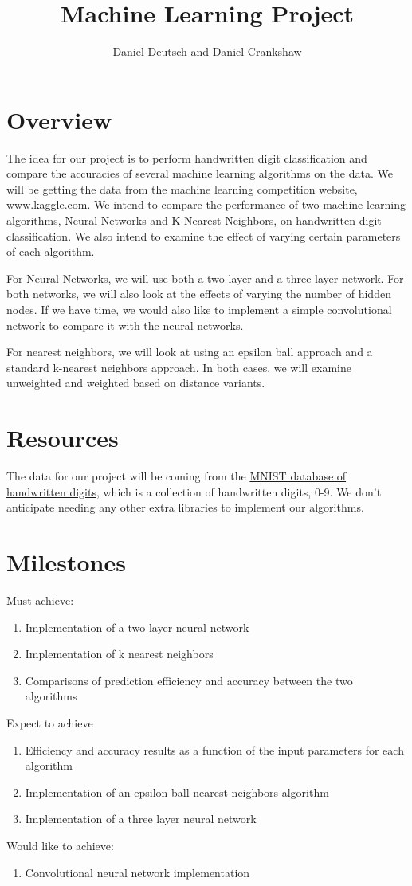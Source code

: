 \documentclass[11pt,a4paper]{article}
\author{Daniel Deutsch and Daniel Crankshaw}
\title{Machine Learning Project}
\date{}
\begin{document}
\maketitle
\section*{Overview}
The idea for our project is to perform handwritten digit classification and compare the accuracies of several machine learning algorithms on the data. We will be getting the data from the machine learning competition website, www.kaggle.com. We intend to compare the performance of two machine learning algorithms, Neural Networks and K-Nearest Neighbors, on handwritten digit classification. We also intend to examine the effect of varying certain parameters of each algorithm. 

For Neural Networks, we will use both a two layer and a three layer network. For both networks, we will also look at the effects of varying the number of hidden nodes. If we have time, we would also like to implement a simple convolutional network to compare it with the neural networks. 

For nearest neighbors, we will look at using an epsilon ball approach and a standard k-nearest neighbors approach. In both cases, we will examine unweighted and weighted based on distance variants.

\section*{Resources}
The data for our project will be coming from the \href{http://yann.lecun.com/exdb/mnist/index.html}{MNIST database of handwritten digits}, which is a collection of handwritten digits, 0-9. We don’t anticipate needing any other extra libraries to implement our algorithms.

\section*{Milestones}
Must achieve:
\begin{enumerate}
\item Implementation of a two layer neural network
\item Implementation of k nearest neighbors
\item Comparisons of prediction efficiency and accuracy between the two algorithms
\end{enumerate}
Expect to achieve
\begin{enumerate}
\item Efficiency and accuracy results as a function of the input parameters for each algorithm
\item Implementation of an epsilon ball nearest neighbors algorithm
\item Implementation of a three layer neural network
\end{enumerate}
Would like to achieve:
\begin{enumerate}
\item Convolutional neural network implementation
\end{enumerate}
\end{document}
